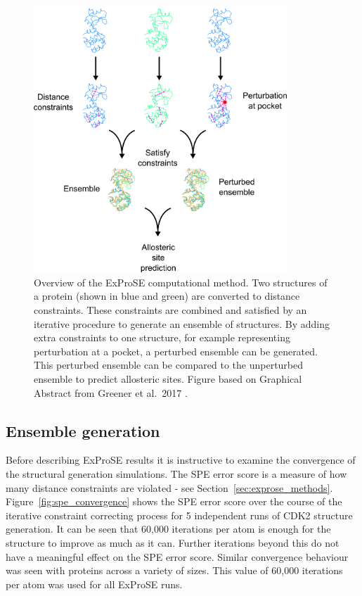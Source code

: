 \begin{figure}
\centering

\includegraphics[width=0.85\textwidth]{figures/exprose_overview/exprose_overview}

\caption[Overview of the ExProSE computational method to generate and perturb ensembles of protein structures]
{Overview of the ExProSE computational method.
Two structures of a protein (shown in blue and green) are converted to distance constraints.
These constraints are combined and satisfied by an iterative procedure to generate an ensemble of structures.
By adding extra constraints to one structure, for example representing perturbation at a pocket, a perturbed ensemble can be generated.
This perturbed ensemble can be compared to the unperturbed ensemble to predict allosteric sites.
Figure based on Graphical Abstract from Greener et al.\ 2017 \cite{Greener2017}.}

\label{fig:exprose_overview}
\end{figure}


\subsection{Ensemble generation}

Before describing ExProSE results it is instructive to examine the convergence of the structural generation simulations.
The SPE error score is a measure of how many distance constraints are violated - see Section~\ref{sec:exprose_methods}.
Figure~\ref{fig:spe_convergence} shows the SPE error score over the course of the iterative constraint correcting process for 5 independent runs of CDK2 structure generation.
It can be seen that 60,000 iterations per atom is enough for the structure to improve as much as it can.
Further iterations beyond this do not have a meaningful effect on the SPE error score.
Similar convergence behaviour was seen with proteins across a variety of sizes.
This value of 60,000 iterations per atom was used for all ExProSE runs.



